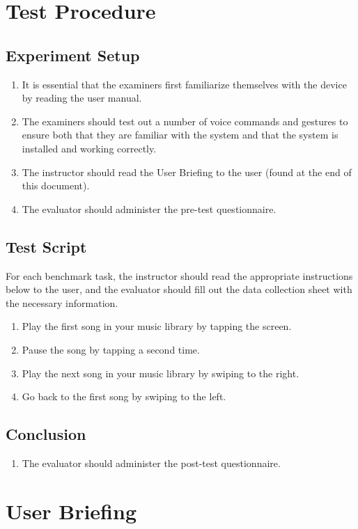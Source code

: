 \documentclass[12pt,letterpaper]{article}
\begin{document}
\section{Test Procedure}

\subsection{Experiment Setup}

\begin{enumerate}
\item It is essential that the examiners first familiarize themselves with the device by reading the user manual.
\item The examiners should test out a number of voice commands and gestures to ensure both that they are familiar with the system and that the system is installed and working correctly.
\item The instructor should read the User Briefing to the user (found at the end of this document).
\item The evaluator should administer the pre-test questionnaire.
\end{enumerate}

\subsection{Test Script}

For each benchmark task, the instructor should read the appropriate instructions below to the user, and the evaluator should fill out the data collection sheet with the necessary information.

\begin{enumerate}
\item Play the first song in your music library by tapping the screen.
\item Pause the song by tapping a second time.
\item Play the next song in your music library by swiping to the right.
\item Go back to the first song by swiping to the left.
\end{enumerate}

\subsection{Conclusion}

\begin{enumerate}
\item The evaluator should administer the post-test questionnaire.
\end{enumerate}

\section{User Briefing}
\end{document}

